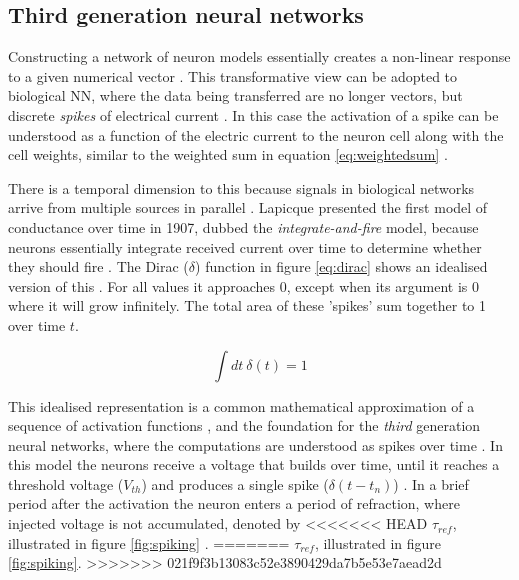 \documentclass[report.tex]{subfiles}
\begin{document}
\subsection{Third generation neural networks}
Constructing a network of neuron models essentially creates a non-linear
response to a given numerical vector \cite{Russel2007}.
This transformative view can be adopted to biological \gls{NN}, where
the data being transferred are no longer vectors, but discrete
\textit{spikes} of electrical current \cite[p. 32]{Dayan2001, Eliasmith2004}.
In this case the activation of a spike can be understood as a function
of the electric current to the neuron cell along with the cell weights,
similar to the weighted sum in equation \ref{eq:weightedsum}
\cite[p. 234]{Dayan2001}.

There is a temporal dimension to this because signals in biological 
networks arrive from multiple sources in parallel \cite{Eliasmith2004}.
Lapicque presented the first model of conductance over time in 1907,
dubbed the \textit{integrate-and-fire} model, because neurons essentially
integrate received current over time to determine whether they should fire 
\cite{Dayan2001, Eliasmith2004}.
The Dirac ($\delta$) function in figure \ref{eq:dirac} shows an idealised
version of this \cite[p. 404]{Dayan2001}.
For all values it approaches 0, except when its argument is
0 where it will grow infinitely.
The total area of these 'spikes' sum together to 1 over time $t$.

\begin{equation} \label{eq:dirac}
\int dt\ \delta(t) = 1
\end{equation}

This idealised representation is a common mathematical approximation of
a sequence of activation functions \cite{Dayan2001, Eliasmith2004},
and the foundation for the \textit{third} generation
neural networks, where the computations are understood as spikes over
time \cite{Maass1997}.
In this model the neurons receive a voltage that builds over time, until
it reaches a threshold voltage ($V_{th}$) and produces a single spike
\mbox{($\delta(t-t_n)$)}
\cite{Dayan2001, Eliasmith2004}.
In a brief period after the activation the neuron enters a period of
refraction, where injected voltage is not accumulated, denoted by 
<<<<<<< HEAD
$\tau_{ref}$, illustrated in figure \ref{fig:spiking}
\cite[p. 82]{Eliasmith2004}.
=======
$\tau_{ref}$, illustrated in figure \ref{fig:spiking}.
>>>>>>> 021f9f3b13083c52e3890429da7b5e53e7aead2d
\end{document}

